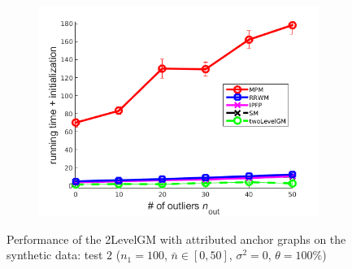 \begin{figure}[h]
\begin{subfigure}[b]{0.33\textwidth}
		\includegraphics[scale=0.25]{"chapter3/fig/SyntheticTest/descr/Results_v4.3.3/Test3/time_summary_avg10t"} 
	\end{subfigure} 	
	\caption[Performance of the 2LevelGM with attributed anchor graphs on the synthetic data (test $2$)]{Performance of the 2LevelGM with attributed anchor graphs on the synthetic data: test $2$ ($n_1=100$, $\bar{n}\in[0,50]$, $\sigma^2=0$, $\theta=100\%$)}
	\label{fig:synTest2_descr_ver433}
\end{figure}
